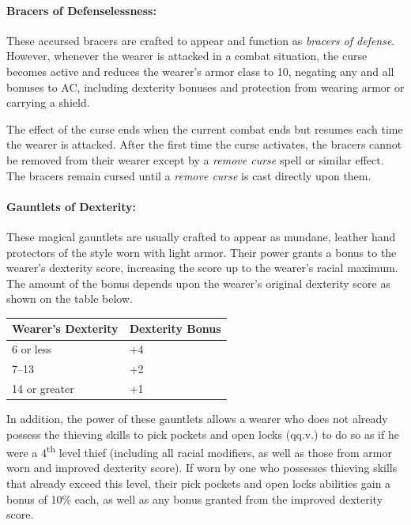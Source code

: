 \begin{multicols}{2}
\paragraph{Bracers of Defenselessness:} These accursed bracers are crafted to appear and function as \textit{bracers of defense}.  However, whenever the wearer is attacked in a combat situation, the curse becomes active and reduces the wearer's armor class to 10, negating any and all bonuses to AC, including dexterity bonuses and protection from wearing armor or carrying a shield.  

The effect of the curse ends when the current combat ends but resumes each time the wearer is attacked.  After the first time the curse activates, the bracers cannot be removed from their wearer except by a \textit{remove curse} spell or similar effect.  The bracers remain cursed until a \textit{remove curse} is cast directly upon them.

\paragraph{Gauntlets of Dexterity:} These magical gauntlets are usually crafted to appear as mundane, leather hand protectors of the style worn with light armor.  Their power grants a bonus to the wearer's dexterity score, increasing the score up to the wearer's racial maximum.  The amount of the bonus depends upon the wearer's original dexterity score as shown on the table below.

\noindent
\begin{tabular}{|p{}|p{}|}
\hline
Wearer's Dexterity	& Dexterity Bonus \\
\hline\hline
\rowcolor[gray]{.9}6 or less	& +4 \\
7--13	& +2 \\
\rowcolor[gray]{.9}14 or greater	& +1 \\
\hline
\end{tabular}

In addition, the power of these gauntlets allows a wearer who does not already possess the thieving skills to pick pockets and open locks (qq.v.) to do so as if he were a 4\textsuperscript{th} level thief (including all racial modifiers, as well as those from armor worn and improved dexterity score).  If worn by one who possesses thieving skills that already exceed this level, their pick pockets and open locks abilities gain a bonus of 10\% each, as well as any bonus granted from the improved dexterity score.


\end{multicols}
